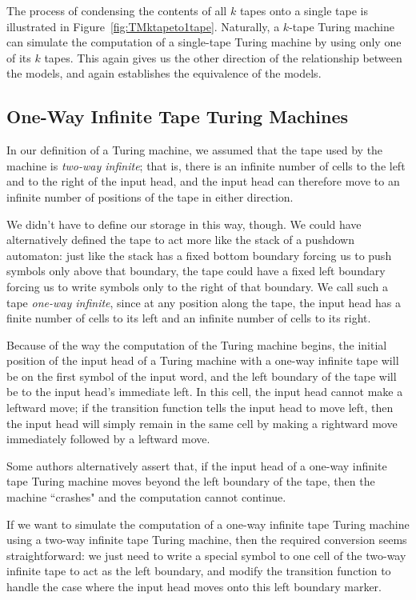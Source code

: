 The process of condensing the contents of all $k$ tapes onto a single tape is illustrated in Figure~\ref{fig:TMktapeto1tape}. Naturally, a $k$-tape Turing machine can simulate the computation of a single-tape Turing machine by using only one of its $k$ tapes. This again gives us the other direction of the relationship between the models, and again establishes the equivalence of the models.

\subsection{One-Way Infinite Tape Turing Machines}

In our definition of a Turing machine, we assumed that the tape used by the machine is \emph{two-way infinite}; that is, there is an infinite number of cells to the left and to the right of the input head, and the input head can therefore move to an infinite number of positions of the tape in either direction.

We didn't have to define our storage in this way, though. We could have alternatively defined the tape to act more like the stack of a pushdown automaton: just like the stack has a fixed bottom boundary forcing us to push symbols only above that boundary, the tape could have a fixed left boundary forcing us to write symbols only to the right of that boundary. We call such a tape \emph{one-way infinite}, since at any position along the tape, the input head has a finite number of cells to its left and an infinite number of cells to its right.

Because of the way the computation of the Turing machine begins, the initial position of the input head of a Turing machine with a one-way infinite tape will be on the first symbol of the input word, and the left boundary of the tape will be to the input head's immediate left. In this cell, the input head cannot make a leftward move; if the transition function tells the input head to move left, then the input head will simply remain in the same cell by making a rightward move immediately followed by a leftward move.

\begin{remark}
Some authors alternatively assert that, if the input head of a one-way infinite tape Turing machine moves beyond the left boundary of the tape, then the machine ``crashes" and the computation cannot continue.
\end{remark}

If we want to simulate the computation of a one-way infinite tape Turing machine using a two-way infinite tape Turing machine, then the required conversion seems straightforward: we just need to write a special symbol to one cell of the two-way infinite tape to act as the left boundary, and modify the transition function to handle the case where the input head moves onto this left boundary marker.

